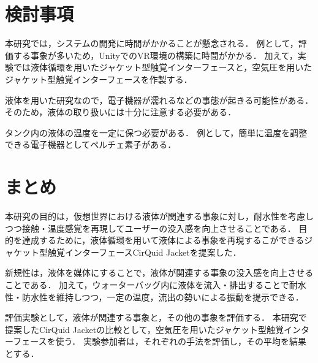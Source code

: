 \documentclass[uplatex]{jsarticle}   %
\begin{document}
\section{検討事項}
本研究では，システムの開発に時間がかかることが懸念される．
例として，評価する事象が多いため，UnityでのVR環境の構築に時間がかかる．
加えて，実験では液体循環を用いたジャケット型触覚インターフェースと，空気圧を用いたジャケット型触覚インターフェースを作製する．

液体を用いた研究なので，電子機器が濡れるなどの事態が起きる可能性がある．
そのため，液体の取り扱いには十分に注意する必要がある．

タンク内の液体の温度を一定に保つ必要がある．
例として，簡単に温度を調整できる電子機器としてペルチェ素子がある．

\section{まとめ}
本研究の目的は，仮想世界における液体が関連する事象に対し，耐水性を考慮しつつ接触・温度感覚を再現してユーザーの没入感を向上させることである．
目的を達成するために，液体循環を用いて液体による事象を再現するこができるジャケット型触覚インターフェースCirQuid Jacketを提案した．

新規性は，液体を媒体にすることで，液体が関連する事象の没入感を向上させることである．
加えて，ウォーターバッグ内に液体を流入・排出することで耐水性・防水性を維持しつつ，一定の温度，流出の勢いによる振動を提示できる．

評価実験として，液体が関連する事象と，その他の事象を評価する．
本研究で提案したCirQuid Jacketの比較として，空気圧を用いたジャケット型触覚インターフェースを使う．
実験参加者は，それぞれの手法を評価し，その平均を結果とする．





\end{document}
